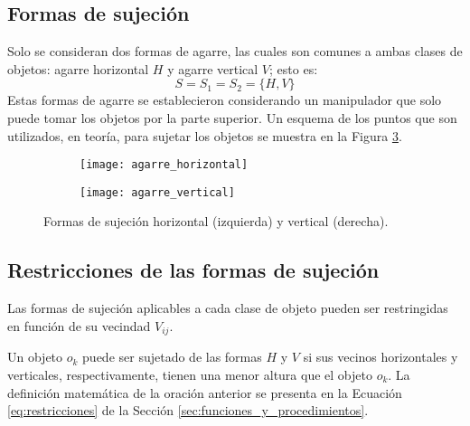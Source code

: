 \subsection{Formas de sujeción}
\label{subsec:formas_sujecion}
%
%
Solo se consideran dos formas de agarre, las cuales son comunes a ambas clases de objetos: agarre horizontal $H$ y agarre vertical $V$; esto es:
%
\begin{equation}
\label{eq:formas_sujecion_usadas}
	S = S_1 = S_2 = \{H, V\}
\end{equation}
%
Estas formas de agarre se establecieron considerando un manipulador que solo puede tomar los objetos por la parte superior. 
Un esquema de los puntos que son utilizados, en teoría, para sujetar los objetos se muestra en la Figura \ref{fig:formas_sujecion}.
%
\begin{figure}[H]
	\begin{subfigure}{0.4\textwidth}
		\texttt{[image: agarre\_horizontal]}%
		\label{subfig:sujecion_H}%
	\end{subfigure}%
	\hspace{1cm}
	\begin{subfigure}{0.4\textwidth}
		\texttt{[image: agarre\_vertical]}%
		\label{subfig:sujecion_V}%
	\end{subfigure}%
	\caption{Formas de sujeción horizontal (izquierda) y vertical (derecha).}%
	\label{fig:formas_sujecion}%
\end{figure}
%
%
\subsection{Restricciones de las formas de sujeción}
\label{subsec:restricciones}
%
%
Las formas de sujeción aplicables a cada clase de objeto pueden ser restringidas en función de su vecindad $V_{ij}$.
	
Un objeto $o_k$ puede ser sujetado de las formas $H$ y $V$ si sus vecinos horizontales y verticales, respectivamente, tienen una menor altura que el objeto $o_k$.
La definición matemática de la oración anterior se presenta en la Ecuación \ref{eq:restricciones} de la Sección \ref{sec:funciones_y_procedimientos}.

